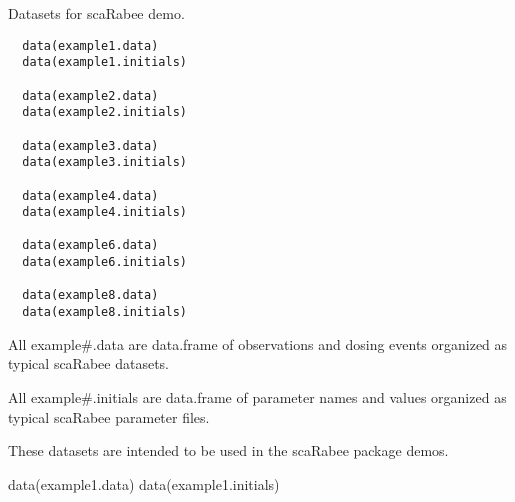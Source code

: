 %
\begin{Description}\relax
Datasets for scaRabee demo.
\end{Description}
%
\begin{Usage}
\begin{verbatim}
  data(example1.data)
  data(example1.initials)
  
  data(example2.data)
  data(example2.initials)
  
  data(example3.data)
  data(example3.initials)
  
  data(example4.data)
  data(example4.initials)
  
  data(example6.data)
  data(example6.initials)
  
  data(example8.data)
  data(example8.initials)
\end{verbatim}
\end{Usage}
%
\begin{Format}
All example\#.data are data.frame of observations and dosing events organized
as typical scaRabee datasets.

All example\#.initials are data.frame of parameter names and values organized
as typical scaRabee parameter files.
\end{Format}
%
\begin{Details}\relax
These datasets are intended to be used in the scaRabee package demos.
\end{Details}
%
\begin{Examples}
\begin{ExampleCode}
data(example1.data)
data(example1.initials)
\end{ExampleCode}
\end{Examples}
